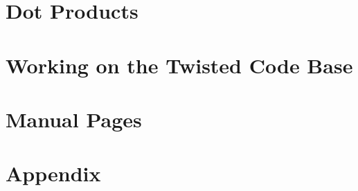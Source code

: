 \documentclass[oneside]{book}
\begin{document}
\chapter{Dot Products}




\chapter{Working on the Twisted Code Base}






\chapter{Manual Pages}


\clearpage

\clearpage

\clearpage

\clearpage

\clearpage

\clearpage

\clearpage

\clearpage

\clearpage

\clearpage

\clearpage
 


\chapter{Appendix}




\end{document}
